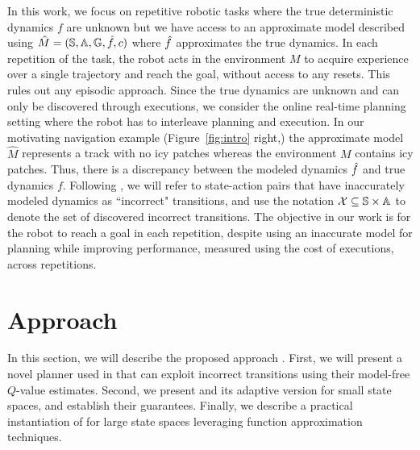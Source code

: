 In this work, we focus on repetitive robotic tasks where the true
deterministic dynamics $f$ are unknown but we have access to an
approximate model described using $\hat{M} = (\mathbb{S}, \mathbb{A},
\mathbb{G}, \hat{f}, c)$ where $\hat{f}$ approximates the true dynamics.
In each repetition of the task, the robot acts in the environment $M$
to acquire experience over a single trajectory and reach the goal,
without access to any resets. This rules out any episodic
approach.
Since the true dynamics are unknown and can only be
discovered through executions, we consider the online real-time
planning setting where the robot has to interleave planning and
execution.
In our motivating navigation example (Figure~\ref{fig:intro} right,)
the approximate model $\hat{M}$ represents a track with no icy patches
whereas the environment $M$ contains icy patches. Thus, there is a 
discrepancy between the modeled dynamics $\hat{f}$ and true
dynamics $f$. Following \cite{cmax}, we will refer to
state-action pairs that have inaccurately modeled dynamics as
``incorrect" transitions, and use the notation $\mathcal{X}
\subseteq \mathbb{S} \times \mathbb{A}$ to denote the set of discovered
incorrect transitions. The objective in our work is for the robot to
reach a goal in each repetition, despite using an inaccurate model for
planning while improving performance, measured using the cost of
executions, across repetitions. 


\section{Approach}
\label{sec:approach}

In this section, we will describe the proposed approach \cmaxpp{}. 
First, we will present a novel planner used in \cmaxpp{} that
can exploit incorrect transitions using their model-free $Q$-value
estimates. Second, we present \cmaxpp{} and its adaptive version
for small state spaces, and establish their guarantees. Finally, we
describe a practical instantiation of \cmaxpp{} for large state spaces
leveraging function approximation techniques.



